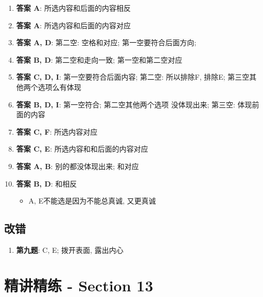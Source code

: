   \begin{enumerate}
    \item \textbf{答案 A}: 所选内容和后面的内容相反
    \item \textbf{答案 A}: 所选内容和后面的内容对应
    \item \textbf{答案 A, D}: 第二空: 空格和对应;
    第一空要符合后面方向;
    \item \textbf{答案 B, D}: 第二空和走向一致; 第一空和第二空对应
    \item \textbf{答案 C, D, I}: 第一空要符合后面内容; 第二空: 
    所以排除F, 排除E; 第三空其他两个选项么有体现
    \item \textbf{答案 B, D, I}: 第一空符合; 第二空其他两个选项
    没体现出来; 第三空: 体现前面的内容
    \item \textbf{答案 C, F}: 所选内容对应
    \item \textbf{答案 C, E}: 所选内容和和后面的内容对应
    \item \textbf{答案 A, B}: 别的都没体现出来; 和对应
    \item \textbf{答案 B, D}: 和相反 
    \begin{itemize}
      \item A, E不能选是因为不能总真诚, 又更真诚
    \end{itemize}
  \end{enumerate}

  \subsection{改错}

    \begin{enumerate}
      \item \textbf{第九题}: C, E; 拨开表面, 露出内心 
    \end{enumerate}

\section{精讲精练 - Section 13}


